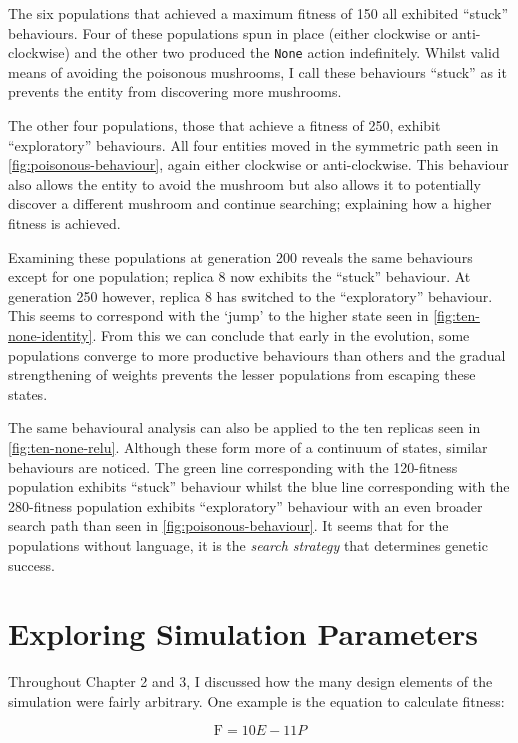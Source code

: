 \documentclass[12pt,a4paper]{report}
\begin{document}
The six populations that achieved a maximum fitness of 150 all exhibited ``stuck'' behaviours. Four of these populations spun in place (either clockwise or anti-clockwise) and the other two produced the \verb~None~ action indefinitely. Whilst valid means of avoiding the poisonous mushrooms, I call these behaviours ``stuck'' as it prevents the entity from discovering more mushrooms.

The other four populations, those that achieve a fitness of 250, exhibit ``exploratory'' behaviours. All four entities moved in the symmetric path seen in \cref{fig:poisonous-behaviour}, again either clockwise or anti-clockwise. This behaviour also allows the entity to avoid the mushroom but also allows it to potentially discover a different mushroom and continue searching; explaining how a higher fitness is achieved. 

Examining these populations at generation 200 reveals the same behaviours except for one population; replica 8 now exhibits the ``stuck'' behaviour. At generation 250 however, replica 8 has switched to the ``exploratory'' behaviour. This seems to correspond with the `jump' to the higher state seen in \cref{fig:ten-none-identity}. From this we can conclude that early in the evolution, some populations converge to more productive behaviours than others and the gradual strengthening of weights prevents the lesser populations from escaping these states.

The same behavioural analysis can also be applied to the ten replicas seen in \cref{fig:ten-none-relu}. Although these form more of a continuum of states, similar behaviours are noticed. The green line corresponding with the 120-fitness population exhibits ``stuck'' behaviour whilst the blue line corresponding with the 280-fitness population exhibits ``exploratory'' behaviour with an even broader search path than seen in \cref{fig:poisonous-behaviour}. It seems that for the populations without language, it is the \emph{search strategy} that determines genetic success.

\section{Exploring Simulation Parameters}\label{section:simulation-parameters}

Throughout Chapter 2 and 3, I discussed how the many design elements of the simulation were fairly arbitrary. One example is the equation to calculate fitness:

$$\mathrm{F} = 10 E - 11 P$$
\end{document}
